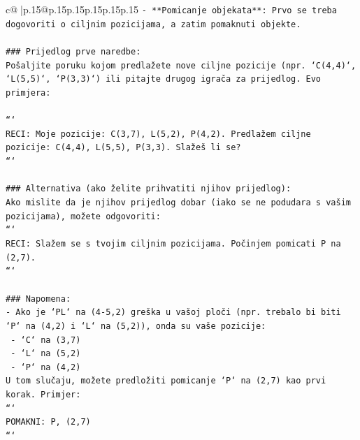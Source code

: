 \documentclass{article}
\begin{document}
{\begin{supertabular}{c@{$\;$}|p{.15\linewidth}@{}p{.15\linewidth}p{.15\linewidth}p{.15\linewidth}p{.15\linewidth}p{.15\linewidth}}
{{{\texttt{{-} **Pomicanje objekata**: Prvo se treba dogovoriti o ciljnim pozicijama, a zatim pomaknuti objekte.} \\
\\ 
\texttt{\#\#\# Prijedlog prve naredbe:} \\
\texttt{Pošaljite poruku kojom predlažete nove ciljne pozicije (npr. `C(4,4)`, `L(5,5)`, `P(3,3)`) ili pitajte drugog igrača za prijedlog. Evo primjera:} \\
\\ 
\texttt{```} \\
\texttt{RECI: Moje pozicije: C(3,7), L(5,2), P(4,2). Predlažem ciljne pozicije: C(4,4), L(5,5), P(3,3). Slažeš li se?} \\
\texttt{```} \\
\\ 
\texttt{\#\#\# Alternativa (ako želite prihvatiti njihov prijedlog):} \\
\texttt{Ako mislite da je njihov prijedlog dobar (iako se ne podudara s vašim pozicijama), možete odgovoriti:} \\
\texttt{```} \\
\texttt{RECI: Slažem se s tvojim ciljnim pozicijama. Počinjem pomicati P na (2,7).} \\
\texttt{```} \\
\\ 
\texttt{\#\#\# Napomena:} \\
\texttt{{-} Ako je `PL` na (4{-}5,2) greška u vašoj ploči (npr. trebalo bi biti `P` na (4,2) i `L` na (5,2)), onda su vaše pozicije:} \\
\texttt{  {-} `C` na (3,7)} \\
\texttt{  {-} `L` na (5,2)} \\
\texttt{  {-} `P` na (4,2)} \\
\texttt{U tom slučaju, možete predložiti pomicanje `P` na (2,7) kao prvi korak. Primjer:} \\
\texttt{```} \\
\texttt{POMAKNI: P, (2,7)} \\
\texttt{```} \\
            }
        }
    }
     \\ \\


\end{supertabular}}
\end{document}

